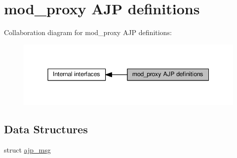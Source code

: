 \hypertarget{group__AJP__defines}{}\section{mod\+\_\+proxy A\+JP definitions}
\label{group__AJP__defines}
Collaboration diagram for mod\+\_\+proxy A\+JP definitions\+:
\nopagebreak
\begin{figure}[H]
\begin{center}
\leavevmode
\includegraphics[width=345pt]{group__AJP__defines}
\end{center}
\end{figure}
\subsection*{Data Structures}
\begin{DoxyCompactItemize}
\item 
struct \hyperlink{structajp__msg}{ajp\+\_\+msg}
\end{DoxyCompactItemize}
